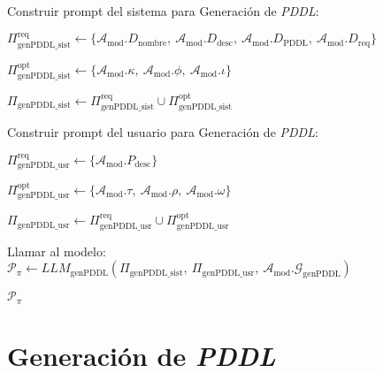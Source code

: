 \begin{anexes}
\begin{algorithm}[H]

Construir prompt del sistema para Generación de \textit{PDDL}:\;

\(\Pi_{\mathrm{genPDDL\_sist}}^{\mathrm{req}} \leftarrow \{\mathcal{A}_{\mathrm{mod}}.D_{\mathrm{nombre}},\ \mathcal{A}_{\mathrm{mod}}.D_{\mathrm{desc}},\ \mathcal{A}_{\mathrm{mod}}.D_{\mathrm{PDDL}},\ \mathcal{A}_{\mathrm{mod}}.D_{\mathrm{req}}\}\)\;

\(\Pi_{\mathrm{genPDDL\_sist}}^{\mathrm{opt}} \leftarrow \{\mathcal{A}_{\mathrm{mod}}.\kappa,\ \mathcal{A}_{\mathrm{mod}}.\phi,\ \mathcal{A}_{\mathrm{mod}}.\iota\}\)\;

\(\Pi_{\mathrm{genPDDL\_sist}} \leftarrow \Pi_{\mathrm{genPDDL\_sist}}^{\mathrm{req}} \cup \Pi_{\mathrm{genPDDL\_sist}}^{\mathrm{opt}}\)\;

Construir prompt del usuario para Generación de \textit{PDDL}:\;

\(\Pi_{\mathrm{genPDDL\_usr}}^{\mathrm{req}} \leftarrow \{\mathcal{A}_{\mathrm{mod}}.P_{\mathrm{desc}}\}\)\;

\(\Pi_{\mathrm{genPDDL\_usr}}^{\mathrm{opt}} \leftarrow \{\mathcal{A}_{\mathrm{mod}}.\tau,\ \mathcal{A}_{\mathrm{mod}}.\rho,\ \mathcal{A}_{\mathrm{mod}}.\omega\}\)\;

\(\Pi_{\mathrm{genPDDL\_usr}} \leftarrow \Pi_{\mathrm{genPDDL\_usr}}^{\mathrm{req}} \cup \Pi_{\mathrm{genPDDL\_usr}}^{\mathrm{opt}}\)\;

Llamar al modelo: 
\(\mathcal{P}_{\pi} \leftarrow LLM_{\mathrm{genPDDL}}(\Pi_{\mathrm{genPDDL\_sist}},\ \Pi_{\mathrm{genPDDL\_usr}},\ \mathcal{A}_{\mathrm{mod}}.\mathcal{G}_{\mathrm{genPDDL}})\)\;

\Return \(\mathcal{P}_{\pi}\)\;
\end{algorithm}

\section*{Generación de \textit{PDDL}}


\end{anexes}
